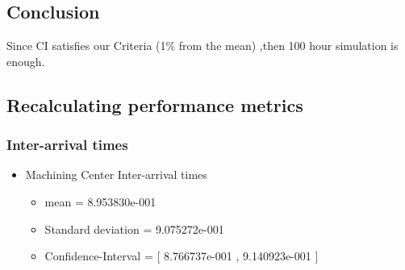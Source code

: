 \documentclass[aps,letterpaper,10pt]{revtex4}
\begin{document}
    \subsection{Conclusion}
        Since CI satisfies our Criteria (1\% from the mean) ,then 100 hour simulation is enough.

    \subsection{Recalculating performance metrics}
        \subsubsection{Inter-arrival times}
            \begin{itemize}
                \item Machining Center Inter-arrival times
                    \begin{itemize}
                        \item mean = 8.953830e-001
                        \item Standard deviation = 9.075272e-001
                        \item Confidence-Interval = [ 8.766737e-001 , 9.140923e-001 ]
                    \end{itemize}
                    \begin{figure}[htp]
                        \begin{center}
\end{center}
\end{figure}
\end{itemize}
\end{document}
